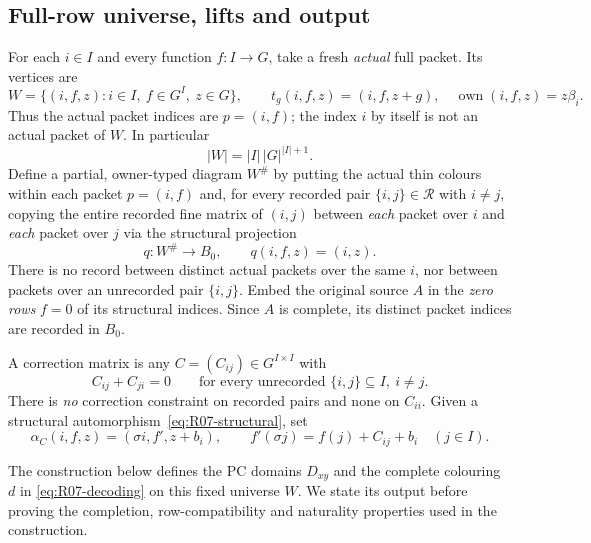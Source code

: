 \subsection{Full-row universe, lifts and output}
\label{subsec:R07-W}

For each $i\in I$ and every function $f:I\to G$, take a fresh
\emph{actual} full packet.  Its vertices are
\begin{equation}\label{eq:R07-W}
 W=\{(i,f,z): i\in I,\ f\in G^I,\ z\in G\},\qquad
 t_g(i,f,z)=(i,f,z+g),\quad
 \operatorname{own}(i,f,z)=z\beta_i.
\end{equation}
Thus the actual packet indices are $p=(i,f)$; the index $i$ by
itself is not an actual packet of $W$.  In particular
\begin{equation}\label{eq:R07-size}
 |W|=|I|\,|G|^{|I|+1}.
\end{equation}
Define a partial, owner-typed diagram $W^\#$ by putting the
actual thin colours within each packet $p=(i,f)$ and, for every
recorded pair $\{i,j\}\in\mathcal R$ with $i\ne j$, copying the
entire recorded fine matrix of $(i,j)$ between \emph{each} packet
over $i$ and \emph{each} packet over $j$ via the structural projection
\[
 q:W^\#\longrightarrow B_0,\qquad q(i,f,z)=(i,z).
\]
There is no record between distinct actual packets over the same
$i$, nor between packets over an unrecorded pair $\{i,j\}$.
Embed the original source $A$ in the \emph{zero rows} $f=0$ of its
structural indices.  Since $A$ is complete, its distinct packet
indices are recorded in $B_0$.

A correction matrix is any $C=(C_{ij})\in G^{I\times I}$ with
\begin{equation}\label{eq:R07-correction}
 C_{ij}+C_{ji}=0\qquad
 \text{for every unrecorded }\{i,j\}\subseteq I,\ i\ne j.
\end{equation}
There is \emph{no} correction constraint on recorded pairs and
none on $C_{ii}$.  Given a structural automorphism~\eqref{eq:R07-structural},
set
\begin{equation}\label{eq:R07-lift}
 \alpha_C(i,f,z)=(\sigma i,f',z+b_i),\qquad
 f'(\sigma j)=f(j)+C_{ij}+b_i\quad(j\in I).
\end{equation}

The construction below defines the PC domains $D_{xy}$ and the complete
colouring $d$ in \eqref{eq:R07-decoding} on this fixed universe $W$.
We state its output before proving the completion, row-compatibility and
naturality properties used in the construction.

